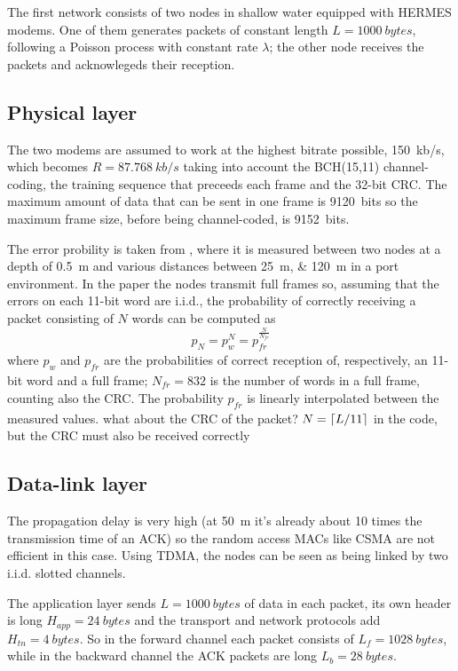The first network consists of two nodes in shallow water equipped with
HERMES modems. One of them generates packets of constant length
$L=\SI{1000}{bytes}$, following a Poisson process with constant rate
$\lambda$; the other node receives the packets and acknowlegeds their
reception.

\subsection{Physical layer}
The two modems are assumed to work at the highest bitrate possible,
\SI{150}{kb/s}, which becomes $R = \SI{87.768}{kb/s}$ taking into
account the BCH(15,11) channel-coding, the training sequence that
preceeds each frame and the 32-bit CRC.
%
The maximum amount of data that can be sent in one frame
is \SI{9120}{bits} so the maximum frame size, before being
channel-coded, is \SI{9152}{bits}.

The error probility is taken from \cite{hermes}, where it is measured
between two nodes at a depth of \SI{0.5}{\m} and various distances
between \SIlist{25; 120}{\m} in a port environment. In the paper the
nodes transmit full frames so, assuming that the errors on each 11-bit
word are i.i.d., the probability of correctly receiving a packet
consisting of $N$ words can be computed as
\begin{equation}
  p_N = p_w^N = p_{\mathit{fr}}^\frac{N}{N_{\mathit{fr}}}
  \label{eq:pN}
\end{equation}
where $p_w$ and $p_{\mathit{fr}}$ are the probabilities of correct
reception of, respectively, an 11-bit word and a full frame;
$N_{\mathit{fr}} = 832$ is the number of words in a full frame,
counting also the CRC.
%
The probability $p_{\mathit{fr}}$ is linearly interpolated between the
measured values.
%
{ \color{red} what about the CRC of the packet? $N = \left\lceil L/11\right\rceil$ in
  the code, but the CRC must also be received correctly}

\subsection{Data-link layer}
The propagation delay is very high (at \SI{50}{\m} it's already about
10 times the transmission time of an ACK) so the random access MACs
like CSMA are not efficient in this case. Using TDMA, the nodes can be
seen as being linked by two i.i.d. slotted channels.

The application layer sends $L=\SI{1000}{bytes}$ of data in each
packet, its own header is long $H_{app} = \SI{24}{bytes}$ and the
transport and network protocols add $H_{tn} = \SI{4}{bytes}$. So in
the forward channel each packet consists of $L_f = \SI{1028}{bytes}$,
while in the backward channel the ACK packets are long $L_b
= \SI{28}{bytes}$.

